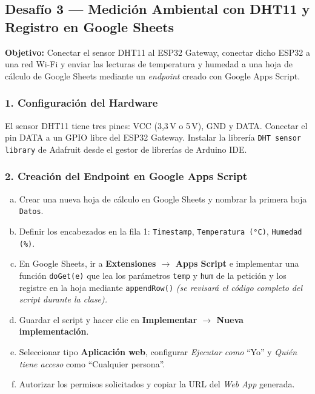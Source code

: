 \documentclass[12pt,leqno]{article}
\begin{document}
\bigskip

\subsection{Desaf\'io 3 --- Medici\'on Ambiental con DHT11 y Registro en Google Sheets}
\label{sec:desafio3}

\textbf{Objetivo:} Conectar el sensor DHT11 al ESP32 Gateway, conectar dicho ESP32
a una red Wi-Fi y enviar las lecturas de temperatura y humedad a una hoja de c\'alculo
de Google Sheets mediante un \textit{endpoint} creado con Google Apps Script.

\subsubsection*{1. Configuraci\'on del Hardware}

El sensor DHT11 tiene tres pines: VCC (3,3\,V o 5\,V), GND y DATA. Conectar el pin
DATA a un GPIO libre del ESP32 Gateway. Instalar la librer\'ia \texttt{DHT sensor
library} de Adafruit desde el gestor de librer\'ias de Arduino IDE.

\subsubsection*{2. Creaci\'on del Endpoint en Google Apps Script}

\begin{enumerate}[(a)]
    \item Crear una nueva hoja de c\'alculo en Google Sheets y nombrar la primera
    hoja \texttt{Datos}.
    \item Definir los encabezados en la fila 1: \texttt{Timestamp},
    \texttt{Temperatura (°C)}, \texttt{Humedad (\%)}.
    \item En Google Sheets, ir a \textbf{Extensiones $\rightarrow$ Apps Script} e
    implementar una funci\'on \texttt{doGet(e)} que lea los par\'ametros \texttt{temp}
    y \texttt{hum} de la petici\'on y los registre en la hoja mediante
    \texttt{appendRow()} \textit{(se revisar\'a el c\'odigo completo del script
    durante la clase).}
    \item Guardar el script y hacer clic en \textbf{Implementar $\rightarrow$
    Nueva implementaci\'on}.
    \item Seleccionar tipo \textbf{Aplicaci\'on web}, configurar \textit{Ejecutar
    como} ``Yo'' y \textit{Qui\'en tiene acceso} como ``Cualquier persona''.
    \item Autorizar los permisos solicitados y copiar la URL del \textit{Web App}
    generada.
\end{enumerate}
\end{document}
